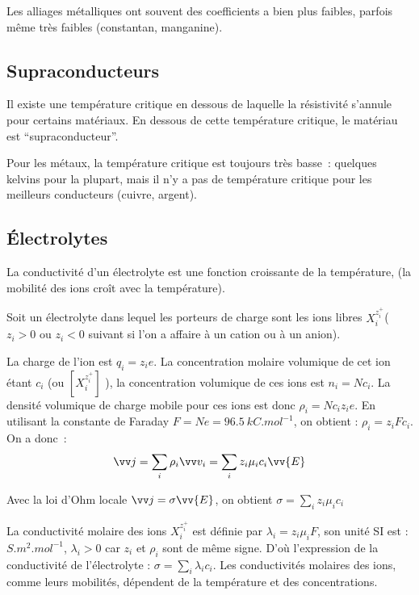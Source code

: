 Les alliages métalliques ont souvent des coefficients a bien plus faibles, 
parfois même très faibles (constantan, manganine).

\subsection{Supraconducteurs}%

Il existe une température critique en dessous de laquelle la résistivité 
s'annule pour certains matériaux. En dessous de cette température critique, le 
matériau est ``supraconducteur''.

Pour les métaux, la température critique est toujours très basse~: quelques 
kelvins pour la plupart, mais il n'y a pas de température critique pour les 
meilleurs conducteurs (cuivre, argent).

\subsection{Électrolytes}%

La conductivité d'un électrolyte est une fonction croissante de la température, 
(la mobilité des ions croît avec la température).

Soit un électrolyte dans lequel les porteurs de charge sont les ions libres 
\(X_i^{z_i^+}\)(\(z_i > 0\) ou \(z_i < 0\) suivant si l'on a affaire à un 
cation ou à un anion).

La charge de l'ion est \(q_i = z_i e\). La concentration molaire volumique de 
cet ion étant \(c_i\) (ou \([X_i^{z_i^+}]\) ), la concentration volumique de 
ces ions est \(n_i = N  c_i\). La densité volumique de charge mobile pour ces 
ions est donc \(\rho_i = N  c_i z_i e\). En utilisant la constante de Faraday 
\(F = N e = \SI{96,5}{kC.mol^{-1}}\), on obtient : \(\rho_i = z_i F c_i\). On a 
donc~:
\begin{equation}%
  \vj = \sum_{i} \rho_i \vvv_i = \sum_i z_i \mu_i c_i \vv{E}
\end{equation}%

Avec la loi d'Ohm locale \(\vj = \sigma \vv{E}\), on obtient \(\sigma = \sum_i 
z_i \mu_i c_i\)

La conductivité molaire des ions \(X_i^{z_i^+}\)  est définie par \(\lambda_i = 
z_i \mu_i F\), son unité SI est : \(\si{S.m^2.mol^{-1}}\), \(\lambda_i > 0\) 
car \(z_i\) et \(\rho_i\) sont de même signe. D'où l'expression de la 
conductivité de l'électrolyte : \(\sigma = \sum_i \lambda_i c_i\). Les 
conductivités molaires des ions, comme leurs mobilités, dépendent de la 
température et des concentrations.

